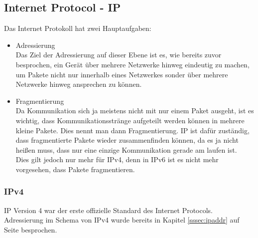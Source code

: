 \documentclass[11pt,a4paper]{report}
\begin{document}
\subsection{Internet Protocol - IP}\label{ssec:ip}
Das Internet Protokoll hat zwei Hauptaufgaben:
\begin{itemize}
\item Adressierung\\
Das Ziel der Adressierung auf dieser Ebene ist es, wie bereits zuvor besprochen, ein Gerät über mehrere Netzwerke hinweg eindeutig zu machen, um Pakete nicht nur innerhalb eines Netzwerkes sonder über mehrere Netzwerke hinweg ansprechen zu können.
\item Fragmentierung\\
Da Kommunikation sich ja meistens nicht mit nur einem Paket ausgeht, ist es wichtig, dass Kommunikationsstränge aufgeteilt werden können in mehrere kleine Pakete. Dies nennt man dann Fragmentierung. IP ist dafür zuständig, dass fragmentierte Pakete wieder zusammenfinden können, da es ja nicht heißen muss, dass nur eine einzige Kommunikation gerade am laufen ist.\\
Dies gilt jedoch nur mehr für IPv4, denn in IPv6 ist es nicht mehr vorgesehen, dass Pakete fragmentieren.
\end{itemize}
\subsubsection{IPv4}
IP Version 4 war der erste offizielle Standard des Internet Protocols.\\
Adressierung im Schema von IPv4 wurde bereits in Kapitel \ref{sssec:ipaddr} auf Seite \pageref{sssec:ipaddr} besprochen.\\
\end{document}
